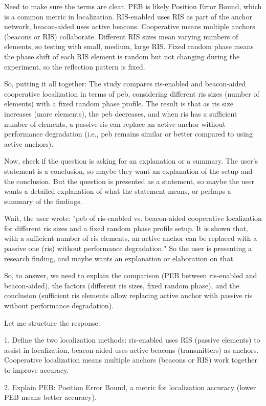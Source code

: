 Need to make sure the terms are clear. PEB is likely Position Error Bound, which is a common metric in localization. RIS-enabled uses RIS as part of the anchor network, beacon-aided uses active beacons. Cooperative means multiple anchors (beacons or RIS) collaborate. Different RIS sizes mean varying numbers of elements, so testing with small, medium, large RIS. Fixed random phase means the phase shift of each RIS element is random but not changing during the experiment, so the reflection pattern is fixed.

So, putting it all together: The study compares ris-enabled and beacon-aided cooperative localization in terms of peb, considering different ris sizes (number of elements) with a fixed random phase profile. The result is that as ris size increases (more elements), the peb decreases, and when ris has a sufficient number of elements, a passive ris can replace an active anchor without performance degradation (i.e., peb remains similar or better compared to using active anchors).

Now, check if the question is asking for an explanation or a summary. The user's statement is a conclusion, so maybe they want an explanation of the setup and the conclusion. But the question is presented as a statement, so maybe the user wants a detailed explanation of what the statement means, or perhaps a summary of the findings.

Wait, the user wrote: "peb of ris-enabled vs. beacon-aided cooperative localization for different ris sizes and a fixed random phase profile setup. It is shown that, with a sufficient number of ris elements, an active anchor can be replaced with a passive one (ris) without performance degradation." So the user is presenting a research finding, and maybe wants an explanation or elaboration on that.

So, to answer, we need to explain the comparison (PEB between ris-enabled and beacon-aided), the factors (different ris sizes, fixed random phase), and the conclusion (sufficient ris elements allow replacing active anchor with passive ris without performance degradation).

Let me structure the response:

1. Define the two localization methods: ris-enabled uses RIS (passive elements) to assist in localization, beacon-aided uses active beacons (transmitters) as anchors. Cooperative localization means multiple anchors (beacons or RIS) work together to improve accuracy.

2. Explain PEB: Position Error Bound, a metric for localization accuracy (lower PEB means better accuracy).

